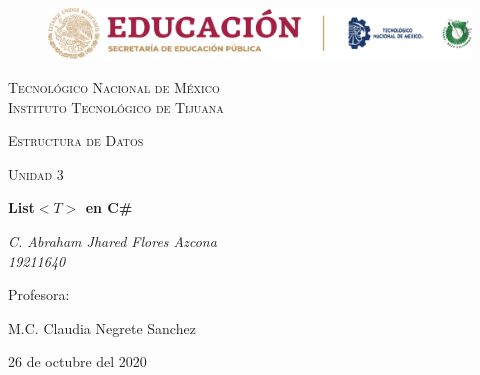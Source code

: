 \documentclass[letterpaper, 12pt]{article}
\begin{document}
    
    \begin{titlepage}
        \begin{figure}[ht]
            \centering
            \includegraphics[width=15cm]{logosITT.png}
        \end{figure}
        \centering
        {\scshape\LARGE Tecnológico Nacional de México\\Instituto Tecnológico de Tijuana\par}
        \vspace{1cm}
        {\scshape\Large Estructura de Datos\par}
        \vspace{1cm}
        {\scshape\Large Unidad 3\par}
        \vspace{1.5cm}
        {\huge\bfseries List\(<\!T\!>\) en C\#\par}
        \vspace{2cm}
        {\Large\itshape C. Abraham Jhared Flores Azcona\\19211640\par}
        \vfill
        Profesora: \par
        M.C. Claudia Negrete Sanchez
        
        \vfill

        {\large 26 de octubre del 2020}
    \end{titlepage}

        \newpage
        \thispagestyle{empty}
        \tableofcontents
        \listoffigures
\end{document}
